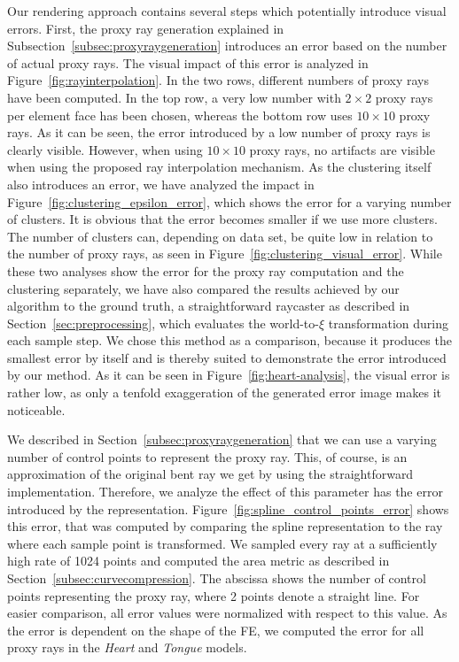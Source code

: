 \documentclass[journal]{vgtc}                %
\begin{document}
Our rendering approach contains several steps which potentially introduce visual errors. First, the proxy ray generation explained in Subsection~\ref{subsec:proxyraygeneration} introduces an error based on the number of actual proxy rays. The visual impact of this error is analyzed in Figure~\ref{fig:rayinterpolation}. In the two rows, different numbers of proxy rays have been computed. In the top row, a very low number with $2 \times 2$ proxy rays per element face has been chosen, whereas the bottom row uses $10 \times 10$ proxy rays. As it can be seen, the error introduced by a low number of proxy rays is clearly visible. However, when using $10 \times 10$ proxy rays, no artifacts are visible when using the proposed ray interpolation mechanism. As the clustering itself also introduces an error, we have analyzed the impact in Figure~\ref{fig:clustering_epsilon_error}, which shows the error for a varying number of clusters. It is obvious that the error becomes smaller if we use more clusters. The number of clusters can, depending on data set, be quite low in relation to the number of proxy rays, as seen in Figure~\ref{fig:clustering_visual_error}. While these two analyses show the error for the proxy ray computation and the clustering separately, we have also compared the results achieved by our algorithm to the ground truth, a straightforward raycaster as described in Section~\ref{sec:preprocessing}, which evaluates the world-to-$\xi$ transformation during each sample step. We chose this method as a comparison, because it produces the smallest error by itself and is thereby suited to demonstrate the error introduced by our method. As it can be seen in Figure~\ref{fig:heart-analysis}, the visual error is rather low, as only a tenfold exaggeration of the generated error image makes it noticeable.

We described in Section~\ref{subsec:proxyraygeneration} that we can use a varying number of control points to represent the proxy ray. This, of course, is an approximation of the original bent ray we get by using the straightforward implementation. Therefore, we analyze the effect of this parameter has the error introduced by the representation. Figure~\ref{fig:spline_control_points_error} shows this error, that was computed by comparing the spline representation to the ray where each sample point is transformed. We sampled every ray at a sufficiently high rate of 1024 points and computed the area metric as described in Section~\ref{subsec:curvecompression}. The abscissa shows the number of control points representing the proxy ray, where 2 points denote a straight line. For easier comparison, all error values were normalized with respect to this value. As the error is dependent on the shape of the FE, we computed the error for all proxy rays in the \emph{Heart} and \emph{Tongue} models.
\end{document}
